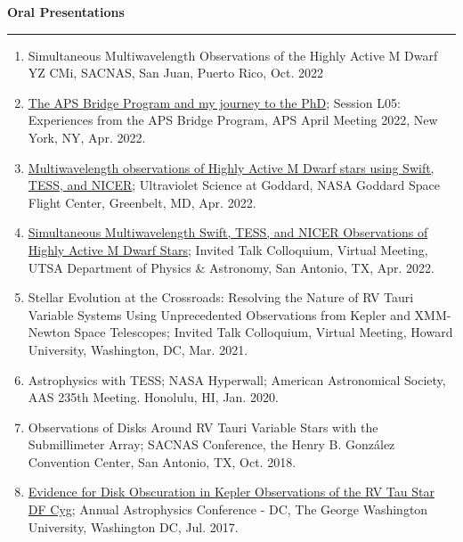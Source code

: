 \documentclass[letter,11pt]{article}
\begin{document}
\noindent
{\bf Oral Presentations} \\
\vspace{-10mm}
\begin{center}
\rule{\textwidth}{0.2mm}
\end{center}
\vspace{-3mm}
\noindent
\begin{enumerate}[\bfseries 1.] 

\item Simultaneous Multiwavelength Observations of the Highly Active M Dwarf YZ CMi, SACNAS, San Juan, Puerto Rico, Oct. 2022

\item \href{https://meetings.aps.org/Meeting/APR22/Session/L05.1}{The APS Bridge Program and my journey to the PhD}; Session L05: Experiences from the APS Bridge Program, APS April Meeting 2022, New York, NY, Apr. 2022.

\item \href{https://asd.gsfc.nasa.gov/conferences/UVsymposium2022/agenda/}{Multiwavelength observations of Highly Active M Dwarf stars using Swift, TESS, and NICER}; Ultraviolet Science at Goddard, NASA Goddard Space Flight Center, Greenbelt, MD, Apr. 2022.

\item \href{https://twitter.com/UTSA_PhyAst/status/1508503792261779464?s=20&t=dVQ_0wPfIXmUPicaAi6VLg}{Simultaneous Multiwavelength Swift, TESS, and NICER Observations of Highly Active M Dwarf Stars}; Invited Talk Colloquium, Virtual Meeting, UTSA Department of Physics \& Astronomy, San Antonio, TX, Apr. 2022. 

\item Stellar Evolution at the Crossroads: Resolving the Nature of RV Tauri Variable Systems Using Unprecedented Observations from Kepler and XMM-Newton Space Telescopes; Invited Talk Colloquium, Virtual Meeting, Howard University, Washington, DC, Mar. 2021.

\item Astrophysics with TESS; NASA Hyperwall; American Astronomical Society, AAS 235th Meeting.  Honolulu, HI, Jan. 2020.

\item Observations of Disks Around RV Tauri Variable Stars with the Submillimeter Array; SACNAS Conference, the Henry B. Gonz\'alez Convention Center, San Antonio, TX, Oct. 2018.

\item \href{https://physics.columbian.gwu.edu/sites/g/files/zaxdzs1976/f/downloads/ACDC2017_Agenda_0.pdf}{Evidence for Disk Obscuration in Kepler Observations of the RV Tau Star DF Cyg};  Annual Astrophysics Conference - DC, The George Washington University, Washington DC, Jul. 2017.


\end{enumerate}
\end{document}

